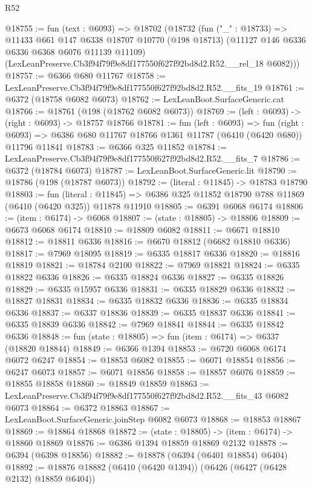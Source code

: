 \begin{lexlean}{R52}
\begin{coremodule}
@18755 := fun (text : @6093) =>
  @18702
    (@18732
      (fun ("_" : @18733) =>
      @11433
        @661
        @147
        @6338
        @18707
        @10770
        (@198 @18713)
        (@11127 @146 @6336 @6336 @6368 @6076 @11139 @11109)
        (LexLeanPreserve.Cb3f94f79f9e8df177550f627f92bd8d2.R52.__rel_18 @6082)))
@18757 := @6366 @680 @11767
@18758 := LexLeanPreserve.Cb3f94f79f9e8df177550f627f92bd8d2.R52.__fits_19
@18761 := @6372 (@18758 @6082 @6073)
@18762 := LexLeanBoot.SurfaceGeneric.cat
@18766 := @18761 (@198 (@18762 @6082 @6073))
@18769 := (left : @6093) -> (right : @6093) -> @18757 @18766
@18781 := fun (left : @6093) =>
  fun (right : @6093) => @6386 @680 @11767 @18766 @1361 @11787 (@6410 (@6420 @680)) @11796 @11841
@18783 := @6366 @325 @11852
@18784 := LexLeanPreserve.Cb3f94f79f9e8df177550f627f92bd8d2.R52.__fits_7
@18786 := @6372 (@18784 @6073)
@18787 := LexLeanBoot.SurfaceGeneric.lit
@18790 := @18786 (@198 (@18787 @6073))
@18792 := (literal : @11845) -> @18783 @18790
@18803 := fun (literal : @11845) =>
  @6386 @325 @11852 @18790 @788 @11869 (@6410 (@6420 @325)) @11878 @11910
@18805 := @6391 @6068 @6174
@18806 := (item : @6174) -> @6068
@18807 := (state : @18805) -> @18806
@18809 := @6673 @6068 @6174
@18810 := @18809 @6082
@18811 := @6671 @18810
@18812 := @18811 @6336
@18816 := @6670 @18812 (@6682 @18810 @6336)
@18817 := @7969 @18095
@18819 := @6335 @18817 @6336
@18820 := @18816 @18819
@18821 := @18784 @2100
@18822 := @7969 @18821
@18824 := @6335 @18822 @6336
@18826 := @6335 @18824 @6336
@18827 := @6335 @18826
@18829 := @6335 @15957 @6336
@18831 := @6335 @18829 @6336
@18832 := @18827 @18831
@18834 := @6335 @18832 @6336
@18836 := @6335 @18834 @6336
@18837 := @6337 @18836
@18839 := @6335 @18837 @6336
@18841 := @6335 @18839 @6336
@18842 := @7969 @18841
@18844 := @6335 @18842 @6336
@18848 := fun (state : @18805) => fun (item : @6174) => @6337 (@18820 @18844)
@18849 := @6366 @1394
@18853 := @6720 @6068 @6174 @6072 @6247
@18854 := @18853 @6082
@18855 := @6071 @18854
@18856 := @6247 @6073
@18857 := @6071 @18856
@18858 := @18857 @6076
@18859 := @18855 @18858
@18860 := @18849 @18859
@18863 := LexLeanPreserve.Cb3f94f79f9e8df177550f627f92bd8d2.R52.__fits_43 @6082 @6073
@18864 := @6372 @18863
@18867 := LexLeanBoot.SurfaceGeneric.joinStep @6082 @6073
@18868 := @18853 @18867
@18869 := @18864 @18868
@18872 := (state : @18805) -> (item : @6174) -> @18860 @18869
@18876 := @6386 @1394 @18859 @18869 @2132
@18878 := @6394 (@6398 @18856)
@18882 := @18878 (@6394 (@6401 @18854) @6404)
@18892 := @18876 @18882 (@6410 (@6420 @1394)) (@6426 (@6427 (@6428 @2132) @18859 @6404))

\end{coremodule}
\end{lexlean}
